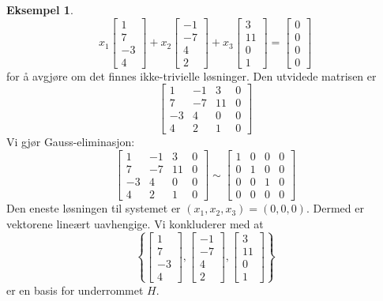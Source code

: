 \documentclass[11pt]{article}
\theoremstyle{definition}
\theoremstyle{definition}
\newtheorem{mitteks}{Eksempel}[section]
\theoremstyle{definition}
\theoremstyle{definition}
\theoremstyle{definition}
\theoremstyle{definition}
\begin{document}
\begin{mitteks}
		\[x_1\left[\begin{array}{r} 
		1 \\
		7 \\
		-3 \\
		4
		\end{array} \right]+
		x_2\left[\begin{array}{r} 
		-1 \\
		-7 \\
		4 \\
		2
		\end{array} \right]+
		x_3\left[\begin{array}{r} 
		3 \\
		11 \\
		0 \\
		1
		\end{array} \right]=
		\left[\begin{array}{r} 
		0 \\
		0 \\
		0 \\
		0
		\end{array} \right]
		\]
		for å avgjøre om det finnes ikke-trivielle løsninger. Den utvidede matrisen er
		\[\left[\begin{array}{rrrr} 
		1 & -1 & 3 & 0 \\
		7 & -7 & 11 & 0 \\
		-3 & 4 & 0 & 0 \\
		4 & 2 & 1 & 0
		\end{array} \right]\]
		Vi gjør Gauss-eliminasjon:
		\[\left[\begin{array}{rrrr} 
		1 & -1 & 3 & 0 \\
		7 & -7 & 11 & 0 \\
		-3 & 4 & 0 & 0 \\
		4 & 2 & 1 & 0
		\end{array} \right]\sim \left[\begin{array}{rrrr} 
		1 & 0 & 0 & 0 \\
		0 & 1 & 0 & 0 \\
		0 & 0 & 1 & 0 \\
		0 & 0 & 0 & 0
		\end{array} \right] \]
		Den eneste løsningen til systemet er \((x_1,x_2,x_3)=(0,0,0) \). Dermed er vektorene lineært uavhengige. Vi konkluderer med at 
		\[\left\lbrace \left[\begin{array}{r} 
		1 \\
		7 \\
		-3 \\
		4
		\end{array} \right],\left[\begin{array}{r} 
		-1 \\
		-7 \\
		4 \\
		2
		\end{array} \right],
		\left[\begin{array}{r} 
		3 \\
		11 \\
		0 \\
		1
		\end{array} \right] \right\rbrace \]
		er en basis for underrommet \(H\).
		\end{mitteks}
		
\end{document}
